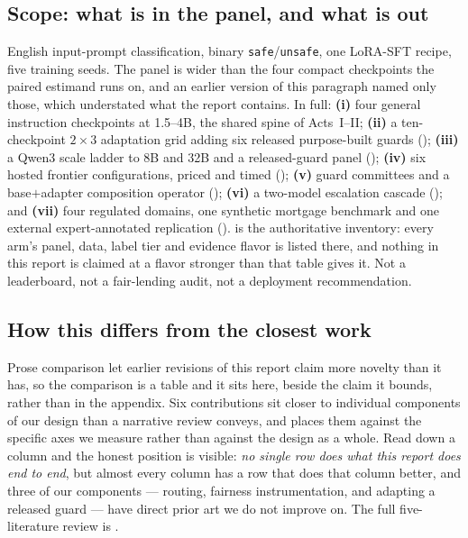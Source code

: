 \documentclass[11pt]{article}
\newcommand{\code}[1]{\texttt{\small #1}}
\begin{document}
\subsection{Scope: what is in the panel, and what is out}
\label{sec:intro-scope}
\noindent English input-prompt classification, binary \code{safe}/\code{unsafe}, one LoRA-SFT
recipe, five training seeds. The panel is wider than the four compact checkpoints the paired estimand
runs on, and an earlier version of this paragraph named only those, which understated what the report
contains. In full: \textbf{(i)} four general instruction checkpoints at 1.5--4B, the shared spine of
Acts~I--II; \textbf{(ii)} a ten-checkpoint $2\times3$ adaptation grid adding six released purpose-built
guards (); \textbf{(iii)} a Qwen3 scale ladder to 8B and 32B and a released-guard
panel (); \textbf{(iv)} six hosted frontier configurations, priced and timed
(); \textbf{(v)} guard committees and a base$+$adapter composition operator
(); \textbf{(vi)} a two-model escalation cascade (); and
\textbf{(vii)} four regulated domains, one synthetic mortgage benchmark and one external
expert-annotated replication ().  is the authoritative inventory:
every arm's panel, data, label tier and evidence flavor is listed there, and nothing in this report is
claimed at a flavor stronger than that table gives it. Not a leaderboard, not a fair-lending audit, not
a deployment recommendation.


\subsection{How this differs from the closest work}
\label{sec:related-closest}
Prose comparison let earlier revisions of this report claim more novelty than it has, so the
comparison is a table and it sits here, beside the claim it bounds, rather than in the appendix.
Six contributions sit closer to individual components of our design than a narrative review
conveys, and  places them against the specific axes we measure rather than
against the design as a whole. Read down a column and the honest position is visible: \emph{no single
row does what this report does end to end}, but almost every column has a row that does that column
better, and three of our components --- routing, fairness instrumentation, and adapting a released
guard --- have direct prior art we do not improve on. The full five-literature review is
.
\end{document}
